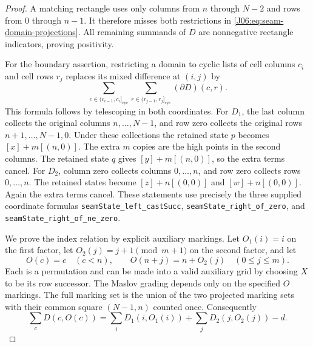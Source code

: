 \documentclass[11pt,oneside]{report}
\theoremstyle{definition}
\numberwithin{equation}{section}
\newcommand{\decl}[1]{\textnormal{\nolinkurl{#1}}}
\begin{document}
\begin{proof}
A matching rectangle uses only columns from $n$ through $N-2$ and
rows from $0$ through $n-1$. It therefore misses both restrictions in
\eqref{J06:eq:seam-domain-projections}. All remaining summands of $D$ are
nonnegative rectangle indicators, proving positivity.

For the boundary assertion, restricting a domain to cyclic lists of
cell columns $c_i$ and cell rows $r_j$ replaces its mixed difference
at $(i,j)$ by
\[
 \sum_{c\in(c_{i-1},c_i]_{\mathrm{cyc}}}
 \sum_{r\in(r_{j-1},r_j]_{\mathrm{cyc}}}(\partial D)(c,r).
\]
This formula follows by telescoping in both coordinates.
For $D_1$, the last column collects the original columns
$n,\ldots,N-1$, and row zero collects the original rows
$n+1,\ldots,N-1,0$. Under these collections the retained state $p$
becomes $[x]+m[(n,0)]$. The extra $m$ copies are the high points in
the second columns. The retained state $q$ gives
$[y]+m[(n,0)]$, so the extra terms cancel.
For $D_2$, column zero collects columns $0,\ldots,n$, and row zero
collects rows $0,\ldots,n$. The retained states become
$[z]+n[(0,0)]$ and $[w]+n[(0,0)]$. Again the extra terms cancel.
These statements use precisely the three supplied coordinate formulas
\decl{seamState_left_castSucc}, \decl{seamState_right_of_zero}, and
\decl{seamState_right_of_ne_zero}.

We prove the index relation by explicit auxiliary markings.
Let $O_1(i)=i$ on the first factor, let
$O_2(j)=j+1\pmod{m+1}$ on the second factor, and let
\[
 O(c)=c\quad(c<n),\qquad
 O(n+j)=n+O_2(j)\quad(0\le j\le m).
\]
Each is a permutation and can be made into a valid auxiliary grid by
choosing $X$ to be its row successor. The Maslov grading depends only on
the specified $O$ markings. The full marking set is the union of the
two projected marking sets with their common square $(N-1,n)$ counted
once. Consequently
\begin{equation}\label{J06:eq:seam-marking-domain-count}
 \sum_c D(c,O(c))=
 \sum_iD_1(i,O_1(i))+\sum_jD_2(j,O_2(j))-d.
\end{equation}


\end{proof}
\end{document}
